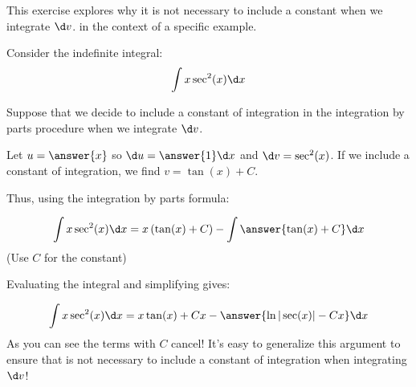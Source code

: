 \documentclass{ximera}
\author{Jim Talamo}
\begin{document}
\begin{exercise}
This exercise explores why it is not necessary to include a constant when we integrate $\d v$. in the context of a specific example.

Consider the indefinite integral:
\[
\int x \sec^2(x) \d x 
\]

Suppose that we decide to include a constant of integration in the integration by parts procedure when we integrate $\d v$.

Let $u=\answer{x}$ so $\d u =\answer{1} \d x$ and $\d v = \sec^2(x)$.  If we include a constant of integration, we find $v = \tan(x)+C$.

Thus, using the integration by parts formula:

\[
\int x \sec^2(x) \d x = x \left( \tan(x) +C \right) - \int \answer{\tan(x) +C} \d x
\]
(Use $C$ for the constant)

\begin{exercise}

Evaluating the integral and simplifying gives:

\[
\int x \sec^2(x) \d x = x \tan(x) +Cx - \answer{\ln|\sec(x)| - Cx} \d x
\]
As you can see the terms with $C$ cancel!  It's easy to generalize this argument to ensure that is not necessary to include a constant of integration when integrating $\d v$!

\end{exercise}
\end{exercise}
\end{document}
